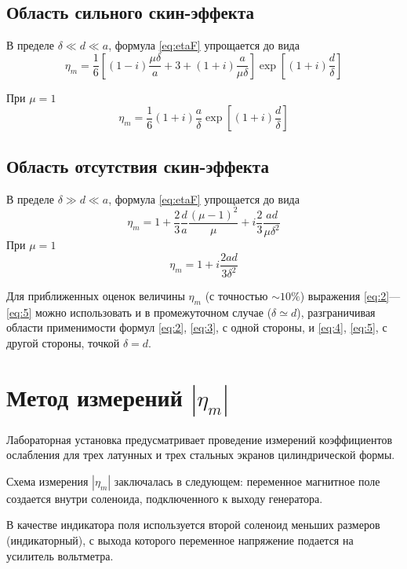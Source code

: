 \subsection{Область сильного скин-эффекта}
В пределе $\delta \ll d \ll a$, формула \eqref{eq:etaF} упрощается до вида
	\begin{equation} 
		\eta_{m}=\frac{1}{6}\left[(1-i) \frac{\mu \delta}{a}+3+(1+i) \frac{a}{\mu \delta}\right] \exp \left[(1+i) \frac{d}{\delta}\right]
	\label{eq:2}
	\end{equation}

При $\mu=1$
\begin{equation} 
	\eta_{m}=\frac{1}{6}(1+i) \frac{a}{\delta} \exp \left[(1+i) \frac{d}{\delta}\right]
\label{eq:3}
\end{equation}


\subsection{Область отсутствия скин-эффекта}
В пределе $\delta \gg d \ll a$, формула \eqref{eq:etaF} упрощается до вида
	\begin{equation}
		\eta_{m}=1+\frac{2}{3}\frac{d}{a}\frac{(\mu-1)^2}{\mu}+i\frac{2}{3}\frac{ad}{\mu \delta^2}
	\label{eq:4}
	\end{equation}
При $\mu=1$
\begin{equation} 
\eta_{m}=1+i \frac{2 a d}{3 \delta^{2}}
\label{eq:5}
\end{equation}

Для приближенных оценок величины $\eta_{m}$ (с точностью $\sim10\%$) выражения \eqref{eq:2}—\eqref{eq:5} можно использовать и в промежуточном случае ($\delta \simeq d$), разграничивая области применимости формул \eqref{eq:2}, \eqref{eq:3}, с одной стороны, и \eqref{eq:4}, \eqref{eq:5}, с другой стороны, точкой $\delta = d$.

\section{Метод измерений $|\eta_m|$}

Лабораторная установка предусматривает проведение измерений коэффициентов ослабления для трех латунных и трех стальных экранов цилиндрической формы. 

Схема измерения $|\eta_m|$ заключалась в следующем: переменное магнитное поле создается внутри соленоида, подключенного к выходу генератора. 

В качестве индикатора поля используется второй соленоид меньших размеров (индикаторный), с выхода которого переменное напряжение подается на усилитель вольтметра. 

